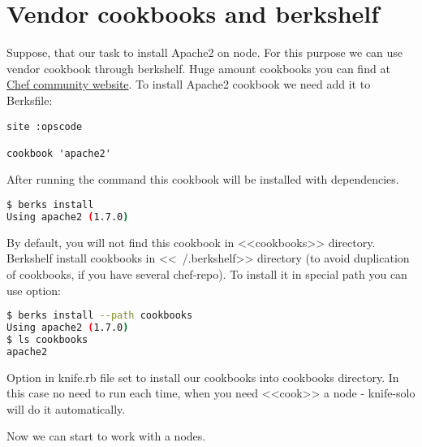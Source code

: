 \section{Vendor cookbooks and berkshelf}
\label{sec:solo-berkshelf}

Suppose, that our task to install Apache2 on node. For this purpose we can use vendor cookbook through berkshelf. Huge amount cookbooks you can find at \href{http://community.opscode.com/cookbooks}{Chef community website}. To install Apache2 cookbook we need add it to Berksfile:

\begin{lstlisting}[label=lst:my-cloud-berkshelf1,title=my-cloud/Berksfile]
site :opscode

cookbook 'apache2'
\end{lstlisting}

After running the command  this cookbook will be installed with dependencies.

\begin{lstlisting}[language=Bash,label=lst:my-cloud-berkshelf2]
$ berks install
Using apache2 (1.7.0)
\end{lstlisting}

By default, you will not find this cookbook in <<cookbooks>> directory. Berkshelf install cookbooks in <<~/.berkshelf>> directory (to avoid duplication of cookbooks, if you have several chef-repo). To install it in special path you can use  option:

\begin{lstlisting}[language=Bash,label=lst:my-cloud-berkshelf3]
$ berks install --path cookbooks
Using apache2 (1.7.0)
$ ls cookbooks
apache2
\end{lstlisting}

Option  in knife.rb file set to install our cookbooks into cookbooks directory. In this case no need to run  each time, when you need <<cook>> a node - knife-solo will do it automatically.

Now we can start to work with a nodes.
